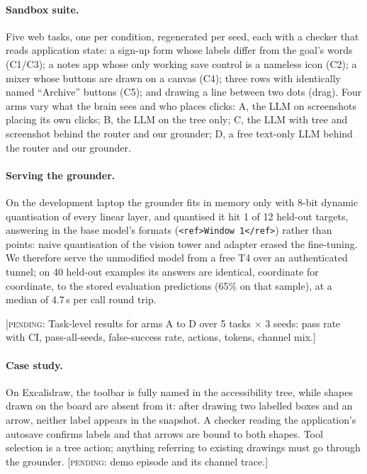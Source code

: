 \documentclass[11pt]{article}
\newcommand{\pending}[1]{\textcolor{red!70!black}{[\textsc{pending}: #1]}}
\begin{document}
\paragraph{Sandbox suite.} Five web tasks, one per condition, regenerated per seed, each with a checker
that reads application state: a sign-up form whose labels differ from the goal's words (C1/C3); a notes
app whose only working save control is a nameless icon (C2); a mixer whose buttons are drawn on a canvas
(C4); three rows with identically named ``Archive'' buttons (C5); and drawing a line between two dots
(drag). Four arms vary what the brain sees and who places clicks: A, the LLM on screenshots placing its
own clicks; B, the LLM on the tree only; C, the LLM with tree and screenshot behind the router and our
grounder; D, a free text-only LLM behind the router and our grounder.

\paragraph{Serving the grounder.} On the development laptop the grounder fits in memory only with 8-bit
dynamic quantisation of every linear layer, and quantised it hit 1 of 12 held-out targets, answering in the
base model's formats (\texttt{<ref>Window 1</ref>}) rather than points: naive quantisation of the vision
tower and adapter erased the fine-tuning. We therefore serve the unmodified model from a free T4 over an
authenticated tunnel; on 40 held-out examples its answers are identical, coordinate for coordinate, to the
stored evaluation predictions (65\% on that sample), at a median of 4.7\,s per call round trip.

\pending{Task-level results for arms A to D over 5 tasks $\times$ 3 seeds: pass rate with CI, pass-all-seeds,
false-success rate, actions, tokens, channel mix.}

\paragraph{Case study.} On Excalidraw, the toolbar is fully named in the accessibility tree, while shapes
drawn on the board are absent from it: after drawing two labelled boxes and an arrow, neither label appears
in the snapshot. A checker reading the application's autosave confirms labels and that arrows are bound to
both shapes. Tool selection is a tree action; anything referring to existing drawings must go through the
grounder. \pending{demo episode and its channel trace.}
\end{document}
